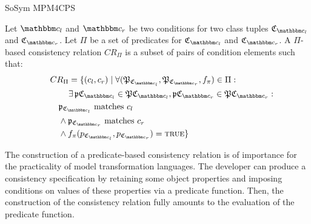 \begin{copiedFrom}{SoSym MPM4CPS}
\begin{definition}
Let $\condition{c}{l}$ and $\condition{c}{r}$ be two conditions for two class tuples $\classtuple{C}{\condition{c}{l}}$ and $\classtuple{C}{\condition{c}{r}}$. 
Let $\Pi$ be a set of predicates for $\classtuple{C}{\condition{c}{l}}$ and $\classtuple{C}{\condition{c}{r}}$. A $\Pi$-based consistency relation $CR_{\Pi}$ is a subset of pairs of condition elements such that:
\begin{align*}
\formulaskip &
CR_{\Pi} = \{(c_l, c_r) \mid \forall (\tuple{P}_{\classtuple{C}{\condition{c}{l}}}, \tuple{P}_{\classtuple{C}{\condition{c}{r}}}, f_\pi) \in \Pi : \\
& \formulaskip\formulaskip
\exists \tuple{p}{\classtuple{C}{\condition{c}{l}}} \in \tuple{P}{\classtuple{C}{\condition{c}{l}}},
\tuple{p}{\classtuple{C}{\condition{c}{r}}} \in \tuple{P}{\classtuple{C}{\condition{c}{r}}}:\\
& \formulaskip
\propertyvaluesettuple{p}{\classtuple{C}{\condition{c}{l}}}\  \text{matches}\ c_l \\
& \formulaskip
\wedge \propertyvaluesettuple{p}{\classtuple{C}{\condition{c}{r}}}\ \text{matches}\ c_r \\
& \formulaskip 
\wedge f_{\pi}(p_{\classtuple{C}{\condition{c}{l}}}, p_{\classtuple{C}{\condition{c}{r}}}) = \textsc{true}\}
\end{align*}
\end{definition}


The construction of a predicate-based consistency relation is of importance for the practicality of model transformation languages. The developer can produce a consistency specification by retaining some object properties and imposing conditions on values of these properties via a predicate function. Then, the construction of the consistency relation fully amounts to the evaluation of the predicate function.


\end{copiedFrom}
